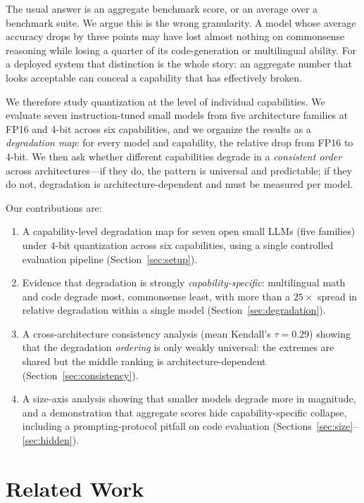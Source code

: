 \documentclass[11pt]{article}
\begin{document}
The usual answer is an aggregate benchmark score, or an average over a benchmark
suite. We argue this is the wrong granularity. A model whose average accuracy
drops by three points may have lost almost nothing on commonsense reasoning while
losing a quarter of its code-generation or multilingual ability. For a deployed
system that distinction is the whole story: an aggregate number that looks
acceptable can conceal a capability that has effectively broken.

We therefore study quantization at the level of individual capabilities. We
evaluate seven instruction-tuned small models from five architecture families at
FP16 and 4-bit across six capabilities, and we organize the results as a
\emph{degradation map}: for every model and capability, the relative drop from
FP16 to 4-bit. We then ask whether different capabilities degrade in a
\emph{consistent order} across architectures---if they do, the pattern is
universal and predictable; if they do not, degradation is architecture-dependent
and must be measured per model.

Our contributions are:
\begin{enumerate}
\item A capability-level degradation map for seven open small LLMs (five families)
under 4-bit quantization across six capabilities, using a single controlled
evaluation pipeline (Section~\ref{sec:setup}).
\item Evidence that degradation is strongly \emph{capability-specific}:
multilingual math and code degrade most, commonsense least, with more than a
$25\times$ spread in relative degradation within a single model
(Section~\ref{sec:degradation}).
\item A cross-architecture consistency analysis (mean Kendall's $\tau = 0.29$)
showing that the degradation \emph{ordering} is only weakly universal: the
extremes are shared but the middle ranking is architecture-dependent
(Section~\ref{sec:consistency}).
\item A size-axis analysis showing that smaller models degrade more in magnitude,
and a demonstration that aggregate scores hide capability-specific collapse,
including a prompting-protocol pitfall on code evaluation
(Sections~\ref{sec:size}--\ref{sec:hidden}).
\end{enumerate}

\section{Related Work}
\end{document}
